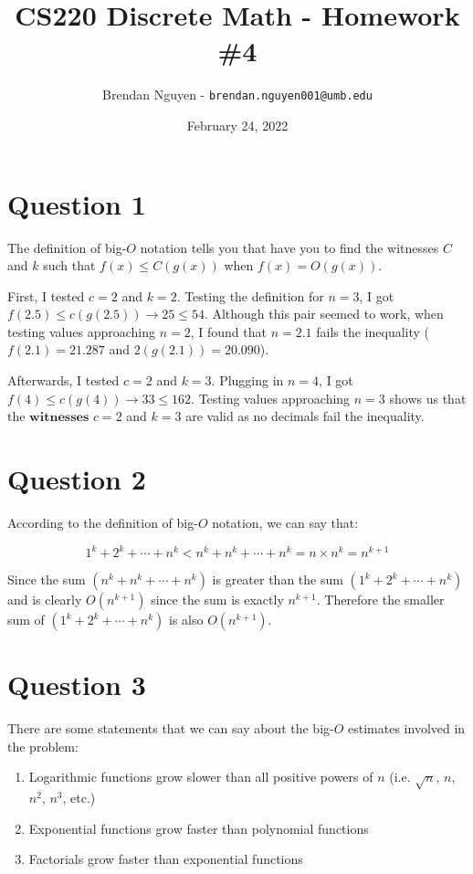 \documentclass[11pt]{article}
\title{CS220 Discrete Math - Homework \#4}
\author{Brendan Nguyen - \texttt{brendan.nguyen001@umb.edu}}
\date{February 24, 2022}
\begin{document}
\maketitle

\section*{Question 1}
The definition of big-$\textit{O}$ notation tells you that have you to find the witnesses $C$ and $k$ such that $f(x) \leq C(g(x))$ when $f(x) = O(g(x))$.

First, I tested $c=2$ and $k=2$. Testing the definition for $n=3$, I got $f(2.5) \leq c(g(2.5)) \to 25 \leq 54$. Although this pair seemed to work, when testing values approaching $n=2$, I found that $n=2.1$ fails the inequality ($f(2.1)=21.287$ and $2(g(2.1))=20.090$).

Afterwards, I tested $c=2$ and $k=3$. Plugging in $n=4$, I got $f(4) \leq c(g(4)) \to 33 \leq 162$. Testing values approaching $n=3$ shows us that the $\textbf{witnesses}$ $c=2$ and $k=3$ are valid as no decimals fail the inequality.

\section*{Question 2}
According to the definition of big-$\textit{O}$ notation, we can say that:

\[1^k + 2^k + \cdots + n^k < n^k + n^k + \cdots + n^k = n \times n^k = n^{k+1}\]

Since the sum $(n^k + n^k + \cdots + n^k)$ is greater than the sum $(1^k + 2^k + \cdots + n^k)$ and is clearly $O(n^{k+1})$ since the sum is exactly $n^{k+1}$. Therefore the smaller sum of $(1^k + 2^k + \cdots + n^k)$ is also $O(n^{k+1})$.

\section*{Question 3}
There are some statements that we can say about the big-$\textit{O}$ estimates involved in the problem:
\begin{enumerate}
    \item Logarithmic functions grow slower than all positive powers of $n$ (i.e. $\sqrt{n}$, $n$, $n^2$, $n^3$, etc.)
    \item Exponential functions grow faster than polynomial functions
    \item Factorials grow faster than exponential functions
\end{enumerate}
\end{document}
